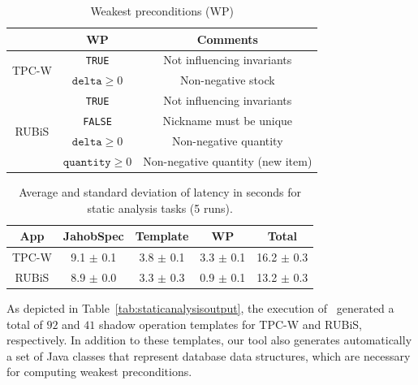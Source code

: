 \begin{table}[t!]
\centering
\begin{tabular}{|c|c|c|}
\hline
 & WP & Comments \\
\hline
\multirow{2}{*}{TPC-W} & \texttt{TRUE} & Not influencing invariants \\
\cline{2-3}
& $\texttt{delta} \geq 0$ & Non-negative stock \\
\hline
\multirow{4}{*}{RUBiS} & \texttt{TRUE} & Not influencing invariants \\
\cline{2-3}
& \texttt{FALSE} & Nickname must be unique \\
\cline{2-3}
& $\texttt{delta} \geq 0$ & Non-negative quantity \\
\cline{2-3}
& $\texttt{quantity} \geq 0$ & Non-negative quantity (new item) \\
\hline
\end{tabular}
\caption{Weakest preconditions (WP)}
\label{tab:generatedwp}
\end{table}

\begin{table}[t!]
\centering
\begin{tabular}{|c|c|c|c|c|}
\hline
App & JahobSpec & Template & WP & Total \\\hline
TPC-W & 9.1 $\pm$ 0.1 & 3.8 $\pm$ 0.1 & 3.3 $\pm$ 0.1 & 16.2 $\pm$ 0.3 \\
RUBiS & 8.9 $\pm$ 0.0 & 3.3 $\pm$ 0.3 & 0.9 $\pm$ 0.1 & 13.2 $\pm$ 0.3 \\
\hline
\end{tabular}
\caption{Average and standard deviation of latency in seconds for static analysis tasks (5 runs).}
\label{tab:timestatic}
\end{table}

As depicted in Table~\ref{tab:staticanalysisoutput}, the execution
of \tool\ generated a total of $92$ and $41$ shadow operation
templates for TPC-W and RUBiS, respectively.  In addition to these
templates, our tool also generates automatically a set of Java classes
that represent database data structures, which are necessary
for computing weakest preconditions.

